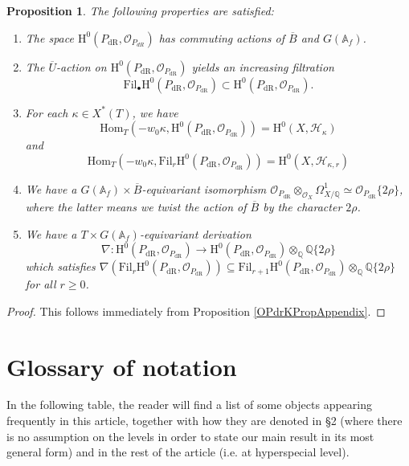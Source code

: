 \documentclass[10pt, oneside]{amsart}
\numberwithin{equation}{subsection}
\newtheorem{prop}[equation]{Proposition}
\theoremstyle{definition}
\theoremstyle{remark}
\newcommand{\opn}[1]{\operatorname{#1}}
\def\Q{\mathbb{Q}}
\begin{document}
\begin{prop}  \label{PropNearlyOverconvergent}
The following properties are satisfied:
\begin{enumerate}
\item The space $ \mathrm{H}^0(P_{\opn{dR}}, \mathcal{O}_{P_{dR}})$ has commuting actions of $\overline{B}$ and $G(\mathbb{A}_f)$.
\item The $\overline{U}$-action on $ \mathrm{H}^0(P_{\opn{dR}}, \mathcal{O}_{P_{\opn{dR}}})$ yields an increasing filtration 
\[
\mathrm{Fil}_\bullet \mathrm{H}^0(P_{\opn{dR}}, \mathcal{O}_{P_{\opn{dR}}}) \subset \mathrm{H}^0(P_{\opn{dR}}, \mathcal{O}_{P_{\opn{dR}}}).
\] 
\item For each $\kappa \in X^*(T)$, we have $$\mathrm{Hom}_{T}(-w_0\kappa,  \mathrm{H}^0(P_{\opn{dR}}, \mathcal{O}_{P_{\opn{dR}}})) = \mathrm{H}^0(X, \mathcal{H}_{\kappa})$$ and $$\mathrm{Hom}_{T}(-w_0\kappa,  \mathrm{Fil}_r\mathrm{H}^0(P_{\opn{dR}}, \mathcal{O}_{P_{\opn{dR}}})) = \mathrm{H}^0(X, \mathcal{H}_{\kappa, r})$$
\item We have a $G(\mathbb{A}_f) \times \overline{B}$-equivariant isomorphism $\mathcal{O}_{P_{\opn{dR}}}\otimes_{\mathcal{O}_X} \Omega^1_{X/\Q} \simeq \mathcal{O}_{ P_{\opn{dR}}} \{2\rho\}$, where the latter means we twist the action of $\overline{B}$ by the character $2\rho$.
\item We have a $T \times G(\mathbb{A}_f)$-equivariant derivation  
\[
\nabla :  \mathrm{H}^0(P_{\opn{dR}}, \mathcal{O}_{P_{\opn{dR}}})  \rightarrow \mathrm{H}^0(P_{\opn{dR}}, \mathcal{O}_{P_{\opn{dR}}}) \otimes_\Q \Q\{2\rho\}
\]
which satisfies $\nabla (\mathrm{Fil}_r \mathrm{H}^0(P_{\opn{dR}}, \mathcal{O}_{P_{\opn{dR}}})) \subseteq \mathrm{Fil}_{r+1} \mathrm{H}^0(P_{\opn{dR}}, \mathcal{O}_{P_{\opn{dR}}}) \otimes_\Q \Q\{2\rho\}$ for all $r \geq 0$.
\end{enumerate}
\end{prop}
\begin{proof}
This follows immediately from Proposition \ref{OPdrKPropAppendix}.
\end{proof}


\section{Glossary of notation} \label{GlossaryNotAppendix}

In the following table, the reader will find a list of some objects appearing frequently in this article, together with how they are denoted in \S 2 (where there is no assumption on the levels in order to state our main result in its most general form) and in the rest of the article (i.e. at hyperspecial level).
\end{document}
